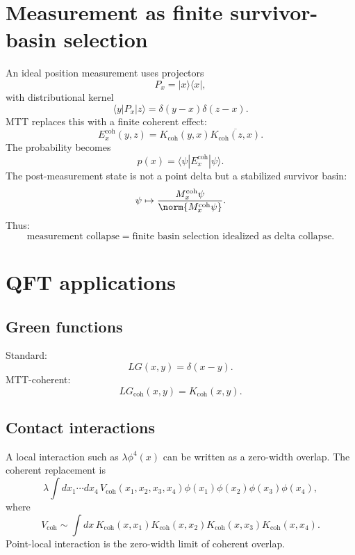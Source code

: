 \documentclass[11pt]{article}
\begin{document}
\section{Measurement as finite survivor-basin selection}

An ideal position measurement uses projectors
\begin{equation}
P_x=|x\rangle\langle x|,
\end{equation}
with distributional kernel
\begin{equation}
\langle y|P_x|z\rangle=\delta(y-x)\delta(z-x).
\end{equation}
MTT replaces this with a finite coherent effect:
\begin{equation}
E_x^{\mathrm{coh}}(y,z)
=K_{\mathrm{coh}}(y,x)\overline{K_{\mathrm{coh}}(z,x)}.
\end{equation}
The probability becomes
\begin{equation}
p(x)=\langle \psi|E_x^{\mathrm{coh}}|\psi\rangle.
\end{equation}
The post-measurement state is not a point delta but a stabilized survivor basin:
\begin{equation}
\psi\mapsto \frac{M_x^{\mathrm{coh}}\psi}{\norm{M_x^{\mathrm{coh}}\psi}}.
\end{equation}
Thus:
\[
\boxed{\text{measurement collapse}=\text{finite basin selection idealized as delta collapse}.}
\]

\section{QFT applications}

\subsection{Green functions}

Standard:
\begin{equation}
LG(x,y)=\delta(x-y).
\end{equation}
MTT-coherent:
\begin{equation}
LG_{\mathrm{coh}}(x,y)=K_{\mathrm{coh}}(x,y).
\end{equation}

\subsection{Contact interactions}

A local interaction such as \(\lambda\phi^4(x)\) can be written as a zero-width overlap.  The
coherent replacement is
\begin{equation}
\lambda\int dx_1\cdots dx_4\,
V_{\mathrm{coh}}(x_1,x_2,x_3,x_4)
\phi(x_1)\phi(x_2)\phi(x_3)\phi(x_4),
\end{equation}
where
\begin{equation}
V_{\mathrm{coh}}\sim
\int dx\,K_{\mathrm{coh}}(x,x_1)K_{\mathrm{coh}}(x,x_2)
K_{\mathrm{coh}}(x,x_3)K_{\mathrm{coh}}(x,x_4).
\end{equation}
Point-local interaction is the zero-width limit of coherent overlap.
\end{document}
